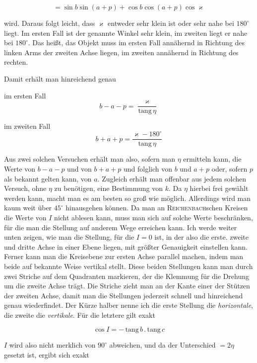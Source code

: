 \[ = \sin b \sin(a+p) + \cos b \cos(a+p) \cos\varkappa \]

\noindent wird. Daraus folgt leicht, dass $\varkappa$ entweder sehr klein ist oder sehr nahe bei $180^\circ$ liegt. Im ersten Fall ist der genannte Winkel sehr klein, im zweiten liegt er nahe bei $180^\circ$. Das heißt, das Objekt muss im ersten Fall annähernd in Richtung des linken Arms der zweiten Achse liegen, im zweiten annähernd in Richtung des rechten.

\par\indent Damit erhält man hinreichend genau

\noindent im ersten Fall \[ b - a - p = \frac{\varkappa}{\mathrm{tang}\,\eta} \]

\noindent im zweiten Fall \[ b + a + p = \frac{\varkappa - 180^\circ}{\mathrm{tang}\,\eta} \]

\par\indent Aus zwei solchen Versuchen erhält man also, sofern man $\eta$ ermitteln kann, die Werte von $b-a-p$ und von $b+a+p$ und folglich von $b$ und $a+p$ oder, sofern $p$ als bekannt gelten kann, von $a$. Zugleich erhält man offenbar aus jedem solchen Versuch, ohne $\eta$ zu benötigen, eine Bestimmung von $k$. Da $\eta$ hierbei frei gewählt werden kann, macht man es am besten so groß wie möglich. Allerdings wird man kaum weit über $45^\circ$ hinausgehen können. Da man an \textsc{Reichenbach}schen Kreisen die Werte von $I$ nicht ablesen kann, muss man sich auf solche Werte beschränken, für die man die Stellung auf anderem Wege erreichen kann. Ich werde weiter unten zeigen, wie man die Stellung, für die $I=0$ ist, in der also die erste. zweite und dritte Achse in einer Ebene liegen, mit größter Genauigkeit einstellen kann. Ferner kann man die Kreisebene zur ersten Achse parallel machen, indem man beide auf bekannte Weise vertikal stellt. Diese beiden Stellungen kann man durch zwei Striche auf dem Quadranten markieren, der die Klemmung für die Drehung um die zweite Achse trägt. Die Striche zieht man an der Kante einer der Stützen der zweiten Achse, damit man die Stellungen jederzeit schnell und hinreichend genau wiederfindet. Der Kürze halber nenne ich die erste Stellung die \emph{horizontale}, die zweite die \emph{vertikale}. Für die letztere gilt exakt

\[ \cos I = -\,\mathrm{tang}\,b\,.\,\mathrm{tang}\,c \]

\noindent $I$ wird also nicht merklich von $90^\circ$ abweichen, und da der Unterschied $=2\eta$ gesetzt ist, ergibt sich exakt

